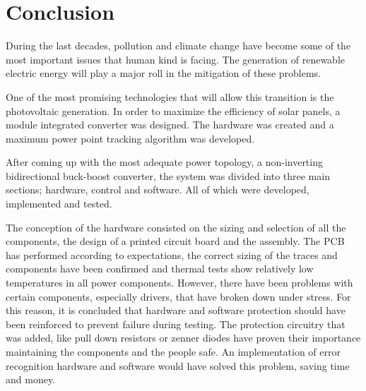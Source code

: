 \chapter{Conclusion}\label{ch:conclusion}

During the last decades, pollution and climate change have become some of the most important issues that human kind is facing. The generation of renewable electric energy will play a major roll in the mitigation of these problems.

One of the most promising technologies that will allow this transition is the photovoltaic generation. 
In order to maximize the efficiency of solar panels, a module integrated converter was designed.
The hardware was created and a maximum power point tracking algorithm was developed.

After coming up with the most adequate power topology, a non-inverting bidirectional buck-boost converter, the system was divided into three main sections; hardware, control and software. All of which were developed, implemented and tested.

The conception of the hardware consisted on the sizing and selection of all the components, the design of a printed circuit board and the assembly. 
The PCB has performed according to expectations, the correct sizing of the traces and components have  been confirmed and thermal tests show relatively low temperatures in all power components. 
However, there have been problems with certain components, especially drivers, that have broken down under stress. For this reason, it is concluded that hardware and software protection should have been reinforced to prevent failure during testing.
The protection circuitry that was added, like pull down resistors or zenner diodes have proven their importance maintaining the components and the people safe. An implementation of error recognition hardware and software would have solved this problem, saving time and money.

